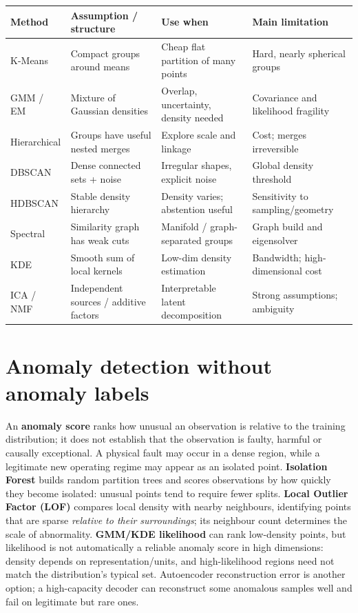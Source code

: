 \begin{center}
\begingroup\ULtight\small
\begin{tabular}{@{}p{.16\linewidth}p{.30\linewidth}p{.30\linewidth}p{.17\linewidth}@{}}
\hline
\textbf{Method} & \textbf{Assumption / structure} & \textbf{Use when} & \textbf{Main limitation}\\\hline
K-Means & Compact groups around means & Cheap flat partition of many points & Hard, nearly spherical groups\\
GMM / EM & Mixture of Gaussian densities & Overlap, uncertainty, density needed & Covariance and likelihood fragility\\
Hierarchical & Groups have useful nested merges & Explore scale and linkage & Cost; merges irreversible\\
DBSCAN & Dense connected sets + noise & Irregular shapes, explicit noise & Global density threshold\\
HDBSCAN & Stable density hierarchy & Density varies; abstention useful & Sensitivity to sampling/geometry\\
Spectral & Similarity graph has weak cuts & Manifold / graph-separated groups & Graph build and eigensolver\\
KDE & Smooth sum of local kernels & Low-dim density estimation & Bandwidth; high-dimensional cost\\
ICA / NMF & Independent sources / additive factors & Interpretable latent decomposition & Strong assumptions; ambiguity\\\hline
\end{tabular}
\label{tab:family}
\endgroup
\end{center}

\section{Anomaly detection without anomaly labels}\label{sec:anomaly}
An \textbf{anomaly score} ranks how unusual an observation is relative to the training distribution; it does not establish that the observation is faulty, harmful or causally exceptional.
A physical fault may occur in a dense region, while a legitimate new operating regime may appear as an isolated point.
\textbf{Isolation Forest} builds random partition trees and scores observations by how quickly they become isolated: unusual points tend to require fewer splits.
\textbf{Local Outlier Factor (LOF)} compares local density with nearby neighbours, identifying points that are sparse \emph{relative to their surroundings}; its neighbour count determines the scale of abnormality.
\textbf{GMM/KDE likelihood} can rank low-density points, but likelihood is not automatically a reliable anomaly score in high dimensions: density depends on representation/units, and high-likelihood regions need not match the distribution's typical set.
Autoencoder reconstruction error is another option; a high-capacity decoder can reconstruct some anomalous samples well and fail on legitimate but rare ones.

